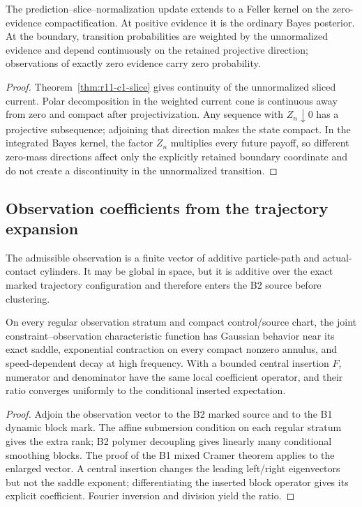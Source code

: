 \begin{theorem}
\label{thm:r11-c1-feller}
The prediction--slice--normalization update extends to a Feller kernel on the
zero-evidence compactification.  At positive evidence it is the ordinary Bayes
posterior.  At the boundary, transition probabilities are weighted by the
unnormalized evidence and depend continuously on the retained projective
direction; observations of exactly zero evidence carry zero probability.
\end{theorem}

\begin{proof}
Theorem~\ref{thm:r11-c1-slice} gives continuity of the unnormalized sliced
current.  Polar decomposition in the weighted current cone is continuous
away from zero and compact after projectivization.  Any sequence with
$Z_n\downarrow0$ has a projective subsequence; adjoining that direction makes
the state compact.  In the integrated Bayes kernel, the factor $Z_n$
multiplies every future payoff, so different zero-mass directions affect only
the explicitly retained boundary coordinate and do not create a discontinuity
in the unnormalized transition.
\end{proof}

\subsection{Observation coefficients from the trajectory expansion}
The admissible observation is a finite vector of additive particle-path and
actual-contact cylinders.  It may be global in space, but it is additive over
the exact marked trajectory configuration and therefore enters the B2 source
before clustering.

\begin{theorem}
\label{thm:r11-c1-coefficient}
On every regular observation stratum and compact control/source chart, the
joint constraint--observation characteristic function has Gaussian behavior
near its exact saddle, exponential contraction on every compact nonzero
annulus, and speed-dependent decay at high frequency.  With a bounded central
insertion $F$, numerator and denominator have the same local coefficient
operator, and their ratio converges uniformly to the conditional inserted
expectation.
\end{theorem}

\begin{proof}
Adjoin the observation vector to the B2 marked source and to the B1 dynamic
block mark.  The affine submersion condition on each regular stratum gives the
extra rank; B2 polymer decoupling gives linearly many conditional smoothing
blocks.  The proof of the B1 mixed Cramer theorem applies to the enlarged
vector.  A central insertion changes the leading left/right eigenvectors but
not the saddle exponent; differentiating the inserted block operator gives
its explicit coefficient.  Fourier inversion and division yield the ratio.
\end{proof}

